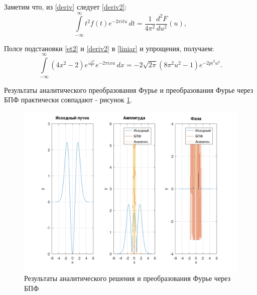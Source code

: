 {\begin{enumerate}
{			Заметим что, из \eqref{deriv} следует \eqref{deriv2}:
			\begin{equation}\label{deriv2}
			\int\limits_{-\infty}^{\infty} t^2 f(t) e^{-2 \pi i t u} \, dt = \frac{1}{4 \pi^2} \frac{d^2 F}{d u^2} (u),
			\end{equation}
			
			Полсе подстановки \eqref{et2} и \eqref{deriv2} в \eqref{liniar} и упрощения, получаем:
			\begin{equation}
			\int\limits_{-\infty}^{\infty} (4 x^2 - 2) e^{\frac{-x^2}{2}} e^{-2 \pi i x u} \,dx
			= -2\sqrt{2 \pi} (8 \pi^2 u^2 - 1) e^{-2 pi^2 u^2}.\nonumber
			\end{equation}
			
			Результаты аналитического преобразования Фурье и преобразования Фурье через БПФ практически совпадают - рисунок \ref{full_solution}.
			\begin{figure}[H]
				\includegraphics[width=0.75\pagewidth]{full_solution}
				\caption{Результаты аналитического решения и преобразования Фурье через БПФ}
				\label{full_solution}
			\end{figure}
		}
	\end{enumerate}
}
\newpage

\titleformat{\section}{\large\bfseries\centering}{\thesection}{0.5em}{\MakeUppercase}
\titleformat{\subsection}[block]{\bfseries\hspace{1em}}{\thesubsection}{0.5em}{}

